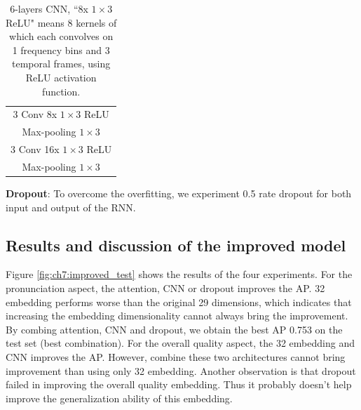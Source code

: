 \begin{table}[ht!]
\centering
\caption{6-layers \gls{CNN},  ``8x $1\times3$ \gls{ReLU}" means 8 kernels of which each convolves on 1 frequency bins and 3 temporal frames, using \gls{ReLU} activation function.}
\label{table:ch7:cnn}
\begin{tabular}{c}
\toprule
3 \gls{Conv} 8x $1{\times}3$ \gls{ReLU}\\
Max-pooling $1{\times}3$ \\
3 \gls{Conv} 16x $1{\times}3$ \gls{ReLU}\\
Max-pooling $1{\times}3$ \\
\bottomrule
\end{tabular}
\end{table}

\textbf{Dropout}: To overcome the overfitting, we experiment 0.5 rate dropout for both input and output of the \gls{RNN}.

\subsection{Results and discussion of the improved model}

Figure \ref{fig:ch7:improved_test} shows the results of the four experiments. For the pronunciation aspect, the attention, \gls{CNN} or dropout improves the \gls{AP}. 32 embedding performs worse than the original 29 dimensions, which indicates that increasing the embedding dimensionality cannot always bring the improvement. By combing attention, \gls{CNN} and dropout, we obtain the best \gls{AP} 0.753 on the test set (best combination). For the overall quality aspect, the 32 embedding and \gls{CNN} improves the \gls{AP}. However, combine these two architectures cannot bring improvement than using only 32 embedding. Another observation is that dropout failed in improving the overall quality embedding. Thus it probably doesn't help improve the generalization ability of this embedding.

